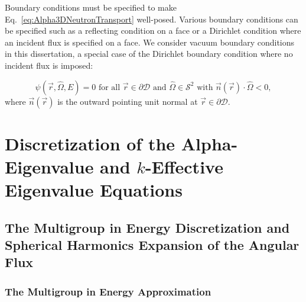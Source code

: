 Boundary conditions must be specified to make Eq.~\ref{eq:Alpha3DNeutronTransport} well-posed. Various boundary conditions can be specified such as a reflecting condition on a face or a Dirichlet condition where an incident flux is specified on a face. We consider vacuum boundary conditions in this dissertation, a special case of the Dirichlet boundary condition where no incident flux is imposed:

\begin{equation}
	\psi(\vec{r},\hat{\Omega},E) = 0 \text{ for all } \vec{r} \in \partial \mathcal{D} \text{ and } \hat{\Omega} \in \mathcal{S}^{2} \text{ with } \vec{n}(\vec{r}) \cdot \hat{\Omega} < 0,
\end{equation}
where $\vec{n}(\vec{r})$ is the outward pointing unit normal at $\vec{r} \in \partial \mathcal{D}$.

\section{Discretization of the Alpha-Eigenvalue and $k$-Effective Eigenvalue Equations}

\subsection{The Multigroup in Energy Discretization and Spherical Harmonics Expansion of the Angular Flux}

\subsubsection{The Multigroup in Energy Approximation}

